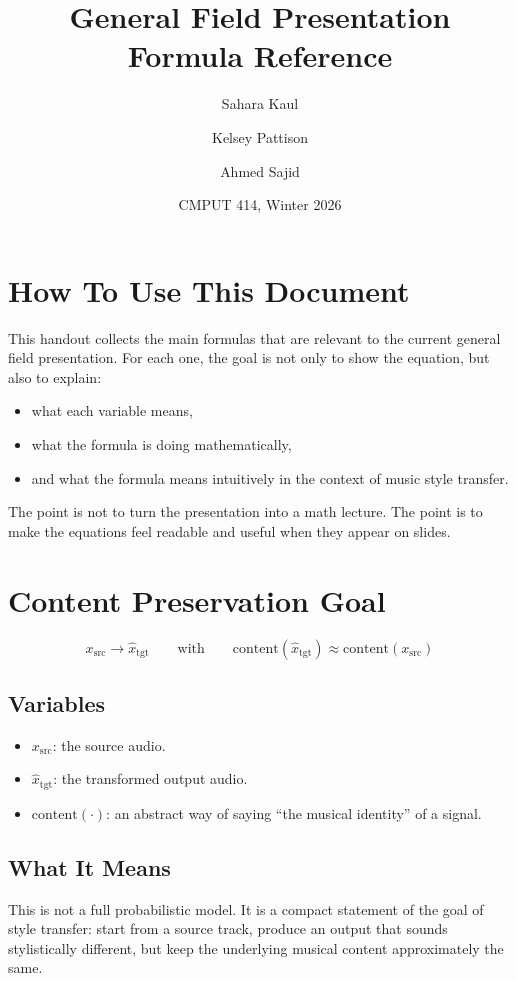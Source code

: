 \documentclass[11pt]{article}
\title{General Field Presentation\\Formula Reference}
\author{Sahara Kaul \and Kelsey Pattison \and Ahmed Sajid}
\date{CMPUT 414, Winter 2026}
\begin{document}
\color{Ink}
\maketitle
\tableofcontents
\newpage

\section{How To Use This Document}

This handout collects the main formulas that are relevant to the current general field presentation. For each one, the goal is not only to show the equation, but also to explain:

\begin{itemize}
\item what each variable means,
\item what the formula is doing mathematically,
\item and what the formula means intuitively in the context of music style transfer.
\end{itemize}

The point is not to turn the presentation into a math lecture. The point is to make the equations feel readable and useful when they appear on slides.

\section{Content Preservation Goal}

\begin{equation*}
x_{\mathrm{src}} \rightarrow \hat{x}_{\mathrm{tgt}}
\qquad \text{with} \qquad
\mathrm{content}(\hat{x}_{\mathrm{tgt}}) \approx \mathrm{content}(x_{\mathrm{src}})
\end{equation*}

\subsection*{Variables}
\begin{itemize}
\item \(x_{\mathrm{src}}\): the source audio.
\item \(\hat{x}_{\mathrm{tgt}}\): the transformed output audio.
\item \(\mathrm{content}(\cdot)\): an abstract way of saying ``the musical identity'' of a signal.
\end{itemize}

\subsection*{What It Means}
This is not a full probabilistic model. It is a compact statement of the goal of style transfer: start from a source track, produce an output that sounds stylistically different, but keep the underlying musical content approximately the same.
\end{document}
